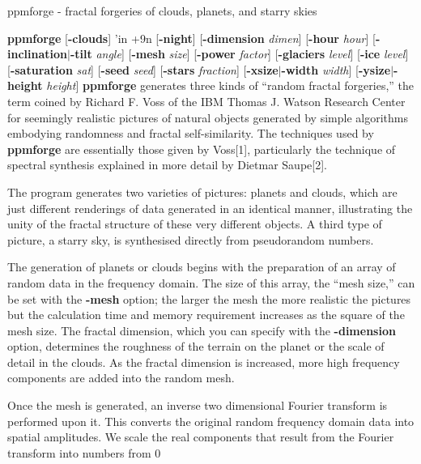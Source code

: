 ppmforge - fractal forgeries of clouds, planets, and starry skies
\raggedright
{\bf ppmforge}
{\rm [}{\bf -clouds}{\rm ]}
'in +9n
{\rm [}{\bf -night}{\rm ]}
{\rm [}{\bf -dimension}
{\it dimen}{\rm ]}
{\rm [}{\bf -hour}
{\it hour}{\rm ]}
{\rm [}{\bf -inclination$|$-tilt}
{\it angle}{\rm ]}
{\rm [}{\bf -mesh}
{\it size}{\rm ]}
{\rm [}{\bf -power}
{\it factor}{\rm ]}
{\rm [}{\bf -glaciers}
{\it level}{\rm ]}
{\rm [}{\bf -ice}
{\it level}{\rm ]}
{\rm [}{\bf -saturation}
{\it sat}{\rm ]}
{\rm [}{\bf -seed}
{\it seed}{\rm ]}
{\rm [}{\bf -stars}
{\it fraction}{\rm ]}
{\rm [}{\bf -xsize$|$-width}
{\it width}{\rm ]}
{\rm [}{\bf -ysize$|$-height}
{\it height}{\rm ]}
\ind{-4.5em}
{\bf ppmforge}
generates three kinds of ``random fractal forgeries,'' the term coined
by Richard F. Voss of the IBM Thomas J. Watson Research Center for
seemingly realistic pictures of natural objects generated by simple
algorithms embodying randomness and fractal self-similarity.  The
techniques used by
{\bf ppmforge}
are essentially those
given by Voss[1], particularly the technique of spectral synthesis
explained in more detail by Dietmar Saupe[2].
\par
The program generates two varieties of pictures: planets and clouds,
which are just different renderings of data generated in an identical
manner, illustrating the unity of the fractal structure of these very
different objects.  A third type of picture, a starry sky, is
synthesised directly from pseudorandom numbers.
\par
The generation of planets or clouds begins with the preparation of an
array of random data in the frequency domain.  The size of this
array, the ``mesh size,'' can be set with the
{\bf -mesh}
option; the larger the mesh the more realistic the pictures but the
calculation time and memory requirement increases as the square of the
mesh size.  The fractal dimension, which you can specify with the
{\bf -dimension}
option, determines the roughness of the terrain on the planet or the
scale of detail in the clouds.  As the fractal dimension is increased,
more high frequency components are added into the random mesh.
\par
Once the mesh is generated, an inverse two dimensional Fourier
transform is performed upon it.  This converts the original random
frequency domain data into spatial amplitudes.  We scale the real
components that result from the Fourier transform into numbers from 0
